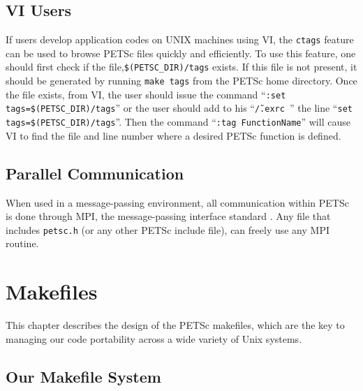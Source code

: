 \section{VI Users}  \label{sec:vi}

If users develop  
application codes on UNIX machines using VI, the {\tt ctags} feature 
can be used to browse PETSc files quickly and efficiently.  To use 
this feature, one should first check if the file,{\tt \$(PETSC\_DIR)/tags} 
exists.  If this file is not present, it should be generated by running 
{\tt make tags} from the PETSc home directory. Once the file exists, 
from VI, the user should issue the command ``{\tt :set tags=\$(PETSC\_DIR)/tags}'' 
or the user should add to
his ``{\tt \~/.exrc }'' the line ``{\tt set tags=\$(PETSC\_DIR)/tags}''.
Then the command ``{\tt :tag FunctionName}'' will cause VI 
to find the file and line number where a desired PETSc function 
is defined. 



\section{Parallel Communication}

When used in a message-passing environment, all communication 
within
PETSc is done through MPI, the message-passing interface standard
\cite{MPI-final}.  Any file that includes {\tt petsc.h} (or any other 
PETSc include file), can freely use any MPI routine.

\chapter{Makefiles}
\label{ch:makefiles}

This chapter describes the design of the PETSc makefiles, which are the
key to managing our code portability across a wide variety of Unix systems.

\section{Our Makefile System}

